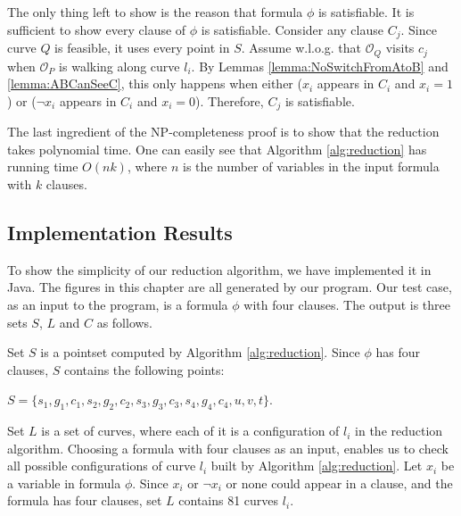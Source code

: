 \documentclass[12pt]{dalthesis}
\def\favoritefont{\bfseries \sffamily}
\def\QED{\ensuremath{{\Box}}}
\def\markatright#1{\leavevmode\unskip\nobreak\quad\hspace*{\fill}{#1}}
\newenvironment{proof}
	{\begin{trivlist}\item[\hskip\labelsep{\favoritefont Proof:}]}
	{\markatright{\QED}\end{trivlist}}
\newcommand{\CO}{{\mathscr O}}
\newcommand{\pset}{S}
\newcommand{\cfev}{{l}}
\begin{document}
\begin{proof}
The only thing left to show is the reason that formula $\phi$ is satisfiable. 
It is sufficient to show every clause of $\phi$ is satisfiable. 
Consider any clause $C_j$.
Since curve $Q$ is feasible, 
it uses every point in $\pset$.  
Assume w.l.o.g. that $\CO_Q$ visits $c_j$ 
when $\CO_P$ is walking along curve $\cfev_i$.  
By Lemmas 
\ref{lemma:NoSwitchFromAtoB} and \ref{lemma:ABCanSeeC},
this only happens when either ($x_i$ appears in $C_i$ and $x_i = 1$)
or ($\neg x_i$ appears in $C_i$ and $x_i =0$). 
Therefore, $C_j$ is satisfiable.
















 

The last ingredient of the NP-completeness proof is
to show that the reduction takes polynomial time.  
One can easily see that Algorithm \ref{alg:reduction}
has running time $O(nk)$, 
where $n$ is the number of variables in 
the input formula with $k$ clauses.






\end{proof}







\subsection{Implementation Results}
To show the simplicity of our reduction algorithm, we have implemented it
in Java.  The figures in this chapter are all generated by our program. 
Our test case, as 
an input to the program, is a formula $\phi$ with four clauses. The output is 
three sets $S$, $L$ and $C$ as follows.

Set $S$ is a pointset computed by 
Algorithm \ref{alg:reduction}.
Since $\phi$ has four clauses, 
$S$
contains the following points:

$S = \{ s_1,g_1,c_1, s_2,g_2,c_2, s_3,g_3,c_3, s_4,g_4,c_4 , u, v, t \}$.


Set $L$ is a set of curves, 
where each of it is a configuration of 
$\cfev_i$ in the reduction algorithm.
Choosing  a formula with four clauses as an input, 
enables us to check all possible configurations of curve $\cfev_i$ built by Algorithm \ref{alg:reduction}. 
Let  $x_i$ be a variable in  formula
$\phi$.
Since $x_i$ or $\neg x_i$ or none could appear in a clause, and the formula has four clauses,  set $L$ contains 81 curves $\cfev_i$. 
\end{document}
